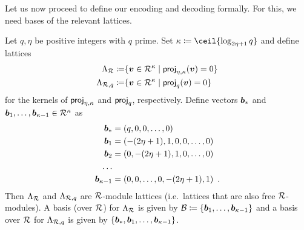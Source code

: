 \medskip
Let us now proceed to define our encoding and decoding formally. For this, we need bases of the relevant lattices.

\begin{proposition}\label{prop:kernellattices}
Let $q,\eta$ be positive integers with $q$ prime. Set $\limbs \coloneqq \ceil{ \log_{2\eta+1}q }$ and define lattices
\begin{align*}
\Lambda_{\mathcal{R}}    \coloneqq &\{\boldsymbol{v}\in\mathcal{R}^\kappa \mid \mathsf{proj}_{\eta,\kappa}(\boldsymbol{v}) = 0\}\\
\Lambda_{\mathcal{R},q} \coloneqq &\{\boldsymbol{v}\in\mathcal{R}^\kappa \mid \mathsf{proj}_{q}(\boldsymbol{v}) = 0\}\\
\end{align*}
for the kernels of $\mathsf{proj}_{\eta,\kappa}$ and $\mathsf{proj}_{q}$, respectively.
Define vectors $\boldsymbol{b}_{\ast}$ and $\boldsymbol{b}_1,\ldots,\boldsymbol{b}_{\kappa-1} \in \mathcal{R}^\kappa$ as
\begin{align*}
\boldsymbol{b}_{\ast} &= (q,0,0,\ldots, 0)\\
\boldsymbol{b}_1       &= (-(2\eta+1), 1, 0,0,\ldots, 0)\\
\boldsymbol{b}_2       &= (0, -(2\eta+1), 1, 0,\ldots, 0)\\
\ldots\\
\boldsymbol{b}_{\kappa-1}&=(0,0,\ldots,0, -(2\eta+1), 1)\enspace.
\end{align*}
Then $\Lambda_{\mathcal{R}}$ and $\Lambda_{\mathcal{R},q}$ are $\mathcal{R}$-module lattices (i.e.\ lattices that are also free $\mathcal{R}$-modules). A basis (over $\mathcal{R}$) for $\Lambda_{\mathcal{R}}$ is given by $\mathcal{B} \coloneqq \{\boldsymbol{b}_1,\ldots,\boldsymbol{b}_{\kappa-1}\}$ and
a basis over $\mathcal{R}$ for $\Lambda_{\mathcal{R},q}$ is given by $\{\boldsymbol{b}_{\ast},\boldsymbol{b}_1,\ldots,\boldsymbol{b}_{\kappa-1}\}$.
\end{proposition}

